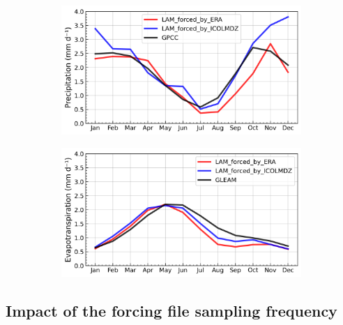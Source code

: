 \begin{figure}[htbp]
    \centering
    \begin{subfigure}[b]{0.49\textwidth}
        \caption{}
        \includegraphics[width=\textwidth]{images/chap4/forcing_source/IP_seasonal_cycle_precip.png}
    \end{subfigure}
    \begin{subfigure}[b]{0.49\textwidth}
        \caption{}
        \includegraphics[width=\textwidth]{images/chap4/forcing_source/IP_seasonal_cycle_evap.png}
    \end{subfigure}
    \caption{}
    \label{fig:forcing_source_SC}
\end{figure}

\clearpage

\subsection{Impact of the forcing file sampling frequency}


